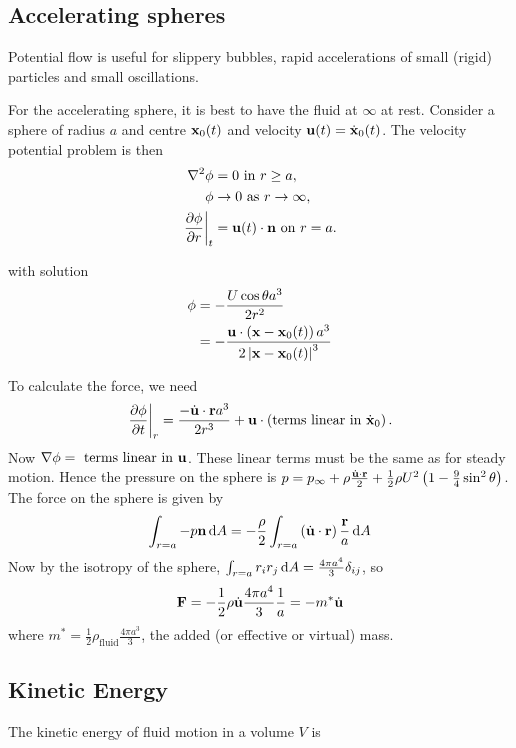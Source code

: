 \documentclass{notes}
\newcommand{\grad}{\nabla}
\newcommand{\lapl}{\nabla^2}
\begin{document}
\subsection{Accelerating spheres}

Potential flow is useful for slippery bubbles, rapid accelerations of
small (rigid) particles and small oscillations.

For the accelerating sphere, it is best to have the fluid at $\infty$
at rest.  Consider a sphere of radius $a$ and centre $\mathbf{x}_0(t)$ and
velocity $\mathbf{u}(t) = \dot{\mathbf{x}}_0(t)$.  The velocity potential
problem is then
\begin{align*}
  \lapl\phi &= 0 \text{ in } r \ge a, \\
  \phi &\rightarrow 0 \text{ as } r \rightarrow \infty, \\
  \left.\pd{\phi}{r}\right|_t &= \vu(t)\cdot\vn \text{ on } r = a.
\end{align*}

with solution
\begin{align*}
  \phi &= - \frac{U \cos \theta a^3}{2r^2} \\
  &=- \frac{\mathbf{u}\cdot\left(\mathbf{x} - \mathbf{x}_0(t) \right) a^3}{2 \left|\mathbf{x} -
      \mathbf{x}_0(t)\right|^3}
\end{align*}

To calculate the force, we need
\[
\left.\frac{\partial \phi}{\partial t}\right|_r = \frac{-\dot{\mathbf{u}}\cdot\mathbf{r} a^3}{2r^3}
+ \mathbf{u}\cdot\left( \text{terms linear in $\dot{\mathbf{x}}_0$} \right).
\]
Now $\grad{\phi} = \text{ terms linear in $\vu$}$.  These linear terms
must be the same as for steady motion.  Hence the pressure on the
sphere is $p = p_\infty + \rho \frac{\dot{\mathbf{u}}\cdot\mathbf{r}}{2} +
\frac{1}{2} \rho U^2 \left( 1 - \frac{9}{4}\sin^2 \theta \right)$.
The force on the sphere is given by
\[
\int_{r=a} -p \mathbf{n} \,\mathrm{d} A = -\frac{\rho}{2} \int_{r=a} \left(
  \dot{\mathbf{u}}\cdot\mathbf{r} \right) \frac{\mathbf{r}}{a} \,\mathrm{d} A
\]
Now by the isotropy of the sphere, $\int_{r=a} r_i r_j \,\mathrm{d} A =
\frac{4 \pi a^4}{3} \delta_{ij}$, so
\[
\mathbf{F} = -\frac{1}{2} \rho \dot{\mathbf{u}} \frac{4 \pi a^4}{3} \frac{1}{a} = -m^*
\dot{\mathbf{u}}
\]
where $m^* = \frac{1}{2}\rho_{\text{fluid}} \frac{4 \pi a^3}{3}$, the added
(or effective or virtual) mass.

\subsection{Kinetic Energy}

The kinetic energy of fluid motion in a volume $V$ is
\end{document}
